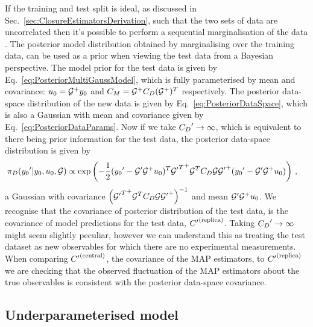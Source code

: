 If the training and test split is ideal, as discussed in
Sec.~\ref{sec:ClosureEstimatorsDerivation}, such that the two sets of data
are uncorrelated then it's
possible to perform a sequential marginalisation of the data \cite{tarantola}.
The posterior model distribution obtained by marginalising over the training
data, can be used as a prior when viewing the test data from a Bayesian
perspective. The model prior for the test data is given by
Eq.~\ref{eq:PosteriorMultiGaussModel}, which is fully
parameterised by mean and covariance: $u_0 = \mathcal{G}^+ y_0$ and
$C_M = \mathcal{G}^+ C_{D} (\mathcal{G}^+)^T$ respectively.
The posterior data-space distribution
of the new data is given by Eq.~\ref{eq:PosteriorDataSpace}, which is also a
Gaussian with mean and covariance given by Eq.~\ref{eq:PosteriorDataParams}.
Now if we take ${{C_{D}}^{\prime}} \to \infty$, which is equivalent to
there being prior information for the test data, the posterior data-space distribution
is given by
\begin{equation}
    \begin{split}
        \pi_D({{y_0}^{\prime}} |y_0, u_0, \mathcal{G})
        &\propto \exp \left( - \frac{1}{2}
            ({{y_0}^{\prime}} - {{\mathcal{G}}^{\prime}} \mathcal{G}^+ u_0)^T
            {{{{\mathcal{G}}^{\prime}}}^T}^+ \mathcal{G}^T C_{D} \mathcal{G} {{{\mathcal{G}}^{\prime}}}^+
            ({{y_0}^{\prime}} - {{\mathcal{G}}^{\prime}} \mathcal{G}^+ u_0)
        \right) \, ,
    \end{split}
\end{equation}
a Gaussian with covariance
$\left( {{{{\mathcal{G}}^{\prime}}}^T}^+ \mathcal{G}^T C_{D} \mathcal{G} {{{\mathcal{G}}^{\prime}}}^+ \right)^{-1}$
and mean ${{\mathcal{G}}^{\prime}} \mathcal{G}^+ u_0$. We recognise that the
covariance of posterior
distribution of the test data, is the covariance of model predictions for the
test data, ${{C}^{\prime}}^{(\rm replica)}$. Taking ${{C_{D}}^{\prime}} \to \infty$ might seem
slightly peculiar, however we can understand this as treating the test dataset
as new observables for which there are no experimental measurements. When comparing
${{C}^{\prime}}^{(\rm central)}$, the covariance of the MAP estimators, to ${{C}^{\prime}}^{(\rm replica)}$ we are
checking that the observed fluctuation of the MAP estimators about the true
observables is consistent with the posterior data-space covariance.

\subsection{Underparameterised model}


